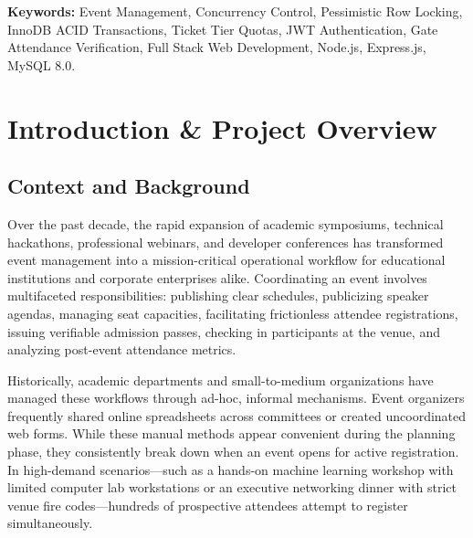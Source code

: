 \documentclass[11pt,a4paper]{report}
\begin{document}
\vspace{0.25in}
\noindent
\textbf{Keywords:} Event Management, Concurrency Control, Pessimistic Row Locking, InnoDB ACID Transactions, Ticket Tier Quotas, JWT Authentication, Gate Attendance Verification, Full Stack Web Development, Node.js, Express.js, MySQL 8.0.

\newpage
\thispagestyle{plain}
\tableofcontents

\newpage
\thispagestyle{plain}
\listoffigures

\newpage
\thispagestyle{plain}
\listoftables

\clearpage



\chapter{Introduction \& Project Overview}

\section{Context and Background}
\justifying
Over the past decade, the rapid expansion of academic symposiums, technical hackathons, professional webinars, and developer conferences has transformed event management into a mission-critical operational workflow for educational institutions and corporate enterprises alike. Coordinating an event involves multifaceted responsibilities: publishing clear schedules, publicizing speaker agendas, managing seat capacities, facilitating frictionless attendee registrations, issuing verifiable admission passes, checking in participants at the venue, and analyzing post-event attendance metrics.

Historically, academic departments and small-to-medium organizations have managed these workflows through ad-hoc, informal mechanisms. Event organizers frequently shared online spreadsheets across committees or created uncoordinated web forms. While these manual methods appear convenient during the planning phase, they consistently break down when an event opens for active registration. In high-demand scenarios---such as a hands-on machine learning workshop with limited computer lab workstations or an executive networking dinner with strict venue fire codes---hundreds of prospective attendees attempt to register simultaneously.
\end{document}
